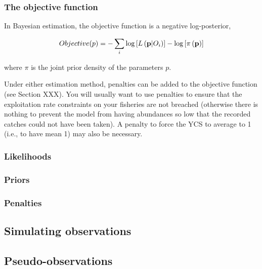 \subsubsection{The objective function}

In Bayesian estimation, the objective function is a negative log-posterior,

\[
Objective(p)= - \sum\limits_i {\log \left[ {L\left( {{\bf{p}}|O_i } \right)} \right]}  - \log \left[ {\pi \left( {\bf{p}} \right)} \right]
\]

where $\pi$ is the joint prior density of the parameters $p$.

Under either estimation method, penalties can be added to the objective function (see Section XXX). You will usually want to use penalties to ensure that the exploitation rate constraints on your fisheries are not breached (otherwise there is nothing to prevent the model from having abundances so low that the recorded catches could not have been taken). A penalty to force the YCS to average to 1 (i.e., to have mean 1) may also be necessary.

\subsubsection{Likelihoods}

\subsubsection{Priors}

\subsubsection{Penalties}

\subsection{Simulating observations}

\subsection{Pseudo-observations}